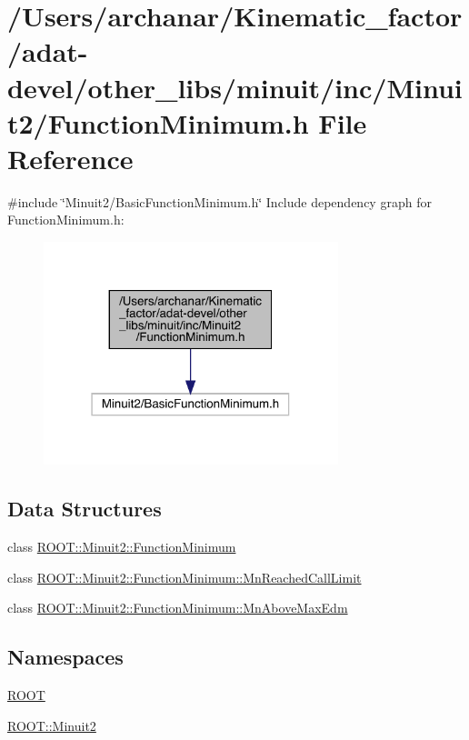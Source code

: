 \hypertarget{adat-devel_2other__libs_2minuit_2inc_2Minuit2_2FunctionMinimum_8h}{}\section{/\+Users/archanar/\+Kinematic\+\_\+factor/adat-\/devel/other\+\_\+libs/minuit/inc/\+Minuit2/\+Function\+Minimum.h File Reference}
\label{adat-devel_2other__libs_2minuit_2inc_2Minuit2_2FunctionMinimum_8h}
{\ttfamily \#include \char`\"{}Minuit2/\+Basic\+Function\+Minimum.\+h\char`\"{}}\newline
Include dependency graph for Function\+Minimum.\+h\+:
\nopagebreak
\begin{figure}[H]
\begin{center}
\leavevmode
\includegraphics[width=243pt]{dd/d1f/adat-devel_2other__libs_2minuit_2inc_2Minuit2_2FunctionMinimum_8h__incl}
\end{center}
\end{figure}
\subsection*{Data Structures}
\begin{DoxyCompactItemize}
\item 
class \mbox{\hyperlink{classROOT_1_1Minuit2_1_1FunctionMinimum}{R\+O\+O\+T\+::\+Minuit2\+::\+Function\+Minimum}}
\item 
class \mbox{\hyperlink{classROOT_1_1Minuit2_1_1FunctionMinimum_1_1MnReachedCallLimit}{R\+O\+O\+T\+::\+Minuit2\+::\+Function\+Minimum\+::\+Mn\+Reached\+Call\+Limit}}
\item 
class \mbox{\hyperlink{classROOT_1_1Minuit2_1_1FunctionMinimum_1_1MnAboveMaxEdm}{R\+O\+O\+T\+::\+Minuit2\+::\+Function\+Minimum\+::\+Mn\+Above\+Max\+Edm}}
\end{DoxyCompactItemize}
\subsection*{Namespaces}
\begin{DoxyCompactItemize}
\item 
 \mbox{\hyperlink{namespaceROOT}{R\+O\+OT}}
\item 
 \mbox{\hyperlink{namespaceROOT_1_1Minuit2}{R\+O\+O\+T\+::\+Minuit2}}
\end{DoxyCompactItemize}

